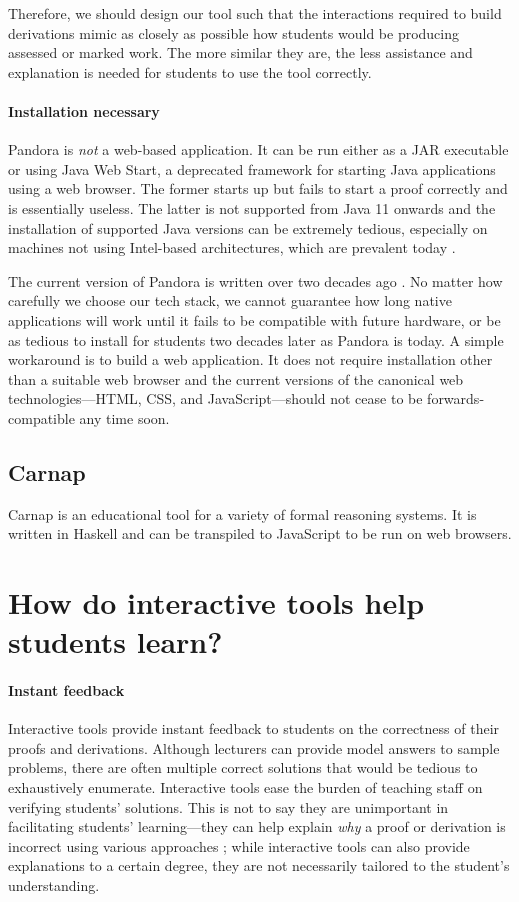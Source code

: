 Therefore, we should design our tool such that the interactions required to build derivations mimic as closely as possible how students would be producing assessed or marked work. The more similar they are, the less assistance and explanation is needed for students to use the tool correctly.

\paragraph{Installation necessary}
Pandora is \textit{not} a web-based application. It can be run either as a JAR executable or using Java Web Start, a deprecated framework for starting Java applications using a web browser. The former starts up but fails to start a proof correctly and is essentially useless. The latter is not supported from Java 11 onwards and the installation of supported Java versions can be extremely tedious, especially on machines not using Intel-based architectures, which are prevalent today .

The current version of Pandora is written over two decades ago . No matter how carefully we choose our tech stack, we cannot guarantee how long native applications will work until it fails to be compatible with future hardware, or be as tedious to install for students two decades later as Pandora is today. A simple workaround is to build a web application. It does not require installation other than a suitable web browser and the current versions of the canonical web technologies---HTML, CSS, and JavaScript---should not cease to be forwards-compatible any time soon. 

\subsection{Carnap}
Carnap \cite{carnap:2018} is an educational tool for a variety of formal reasoning systems. It is written in Haskell and can be transpiled to JavaScript to be run on web browsers.

\section{How do interactive tools help students learn?}
\paragraph{Instant feedback}
Interactive tools provide instant feedback to students on the correctness of their proofs and derivations. Although lecturers can provide model answers to sample problems, there are often multiple correct solutions that would be tedious to exhaustively enumerate. Interactive tools ease the burden of teaching staff on verifying students' solutions. This is not to say they are unimportant in facilitating students' learning---they can help explain \textit{why} a proof or derivation is incorrect using various approaches \cite{nipkow:2012}; while interactive tools can also provide explanations to a certain degree, they are not necessarily tailored to the student's understanding.

